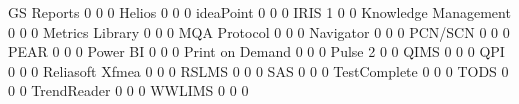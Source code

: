 \documentclass{article}
\begin{document}
\begin{Schunk}
\begin{Soutput}
  GS Reports                                 0       0                        0
  Helios                                     0       0                        0
  ideaPoint                                  0       0                        0
  IRIS                                       1       0                        0
  Knowledge Management                       0       0                        0
  Metrics Library                            0       0                        0
  MQA Protocol                               0       0                        0
  Navigator                                  0       0                        0
  PCN/SCN                                    0       0                        0
  PEAR                                       0       0                        0
  Power BI                                   0       0                        0
  Print on Demand                            0       0                        0
  Pulse                                      2       0                        0
  QIMS                                       0       0                        0
  QPI                                        0       0                        0
  Reliasoft Xfmea                            0       0                        0
  RSLMS                                      0       0                        0
  SAS                                        0       0                        0
  TestComplete                               0       0                        0
  TODS                                       0       0                        0
  TrendReader                                0       0                        0
  WWLIMS                                     0       0                        0
                                          

\end{Soutput}
\end{Schunk}
\end{document}
